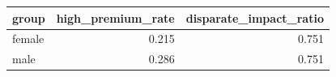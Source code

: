 \begin{tabular}{lrr}
\toprule
group & high_premium_rate & disparate_impact_ratio \\
\midrule
female & 0.215 & 0.751 \\
male & 0.286 & 0.751 \\
\bottomrule
\end{tabular}
